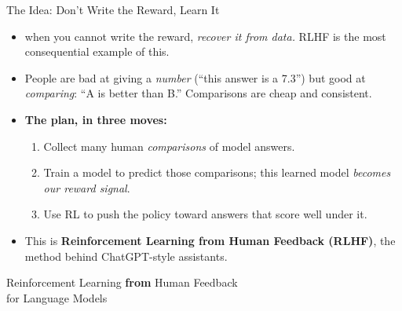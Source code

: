 \begin{frame}{The Idea: Don't Write the Reward, Learn It}
\begin{itemize}\itemsep0.45em
    \item {} when you cannot write the reward,
          \emph{recover it from data.} RLHF is the most consequential example of
          this.
    \item People are bad at giving a \emph{number} (``this answer is a 7.3'') but
          good at \emph{comparing}: ``A is better than B.'' Comparisons are cheap
          and consistent.
    \item \textbf{The plan, in three moves:}
    \begin{enumerate}\footnotesize\itemsep0.2em
        \item Collect many human \emph{comparisons} of model answers.
        \item Train a model to predict those comparisons; this learned model
              \emph{becomes our reward signal}.
        \item Use RL to push the policy toward answers that score well under it.
    \end{enumerate}
    \item This is \textbf{Reinforcement Learning from Human Feedback (RLHF)}, the
          method behind ChatGPT-style assistants.
\end{itemize}
\end{frame}

\begin{frame}{}
\vfill
\centering
{\LARGE Reinforcement Learning \textbf{from} Human Feedback}\\[0.4em]
{\large for Language Models}
\vfill
\end{frame}

